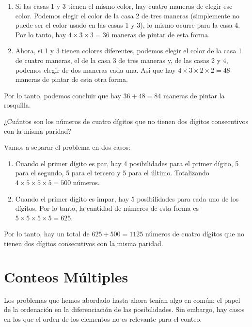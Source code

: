 \documentclass[11pt]{scrartcl}
\begin{document}
\begin{enumerate}
    \item Si las casas 1 y 3 tienen el mismo color, hay cuatro maneras de elegir ese color. Podemos elegir el color de la casa 2 de tres maneras (simplemente no puede ser el color usado en las casas 1 y 3), lo mismo ocurre para la casa 4. Por lo tanto, hay $4 \times 3 \times 3 = 36$ maneras de pintar de esta forma.
    \item Ahora, si 1 y 3 tienen colores diferentes, podemos elegir el color de la casa 1 de cuatro maneras, el de la casa 3 de tres maneras y, de las casas 2 y 4, podemos elegir de dos maneras cada una. Así que hay $4 \times 3 \times 2 \times 2 = 48$ maneras de pintar de esta otra forma.
\end{enumerate}

Por lo tanto, podemos concluir que hay $36 + 48 = 84$ maneras de pintar la rosquilla.

\begin{example}
¿Cuántos son los números de cuatro dígitos que no tienen dos dígitos consecutivos con la misma paridad?
\end{example}

Vamos a separar el problema en dos casos:

\begin{enumerate}
    \item Cuando el primer dígito es par, hay 4 posibilidades para el primer dígito, 5 para el segundo, 5 para el tercero y 5 para el último. Totalizando $4 \times 5 \times 5 \times 5 = 500$ números.
    \item Cuando el primer dígito es impar, hay 5 posibilidades para cada uno de los dígitos. Por lo tanto, la cantidad de números de esta forma es $5 \times 5 \times 5 \times 5 = 625$.
\end{enumerate}

Por lo tanto, hay un total de $625 + 500 = 1125$ números de cuatro dígitos que no tienen dos dígitos consecutivos con la misma paridad.

\section*{Conteos Múltiples}

Los problemas que hemos abordado hasta ahora tenían algo en común: el papel de la ordenación en la diferenciación de las posibilidades. Sin embargo, hay casos en los que el orden de los elementos no es relevante para el conteo.
\end{document}
